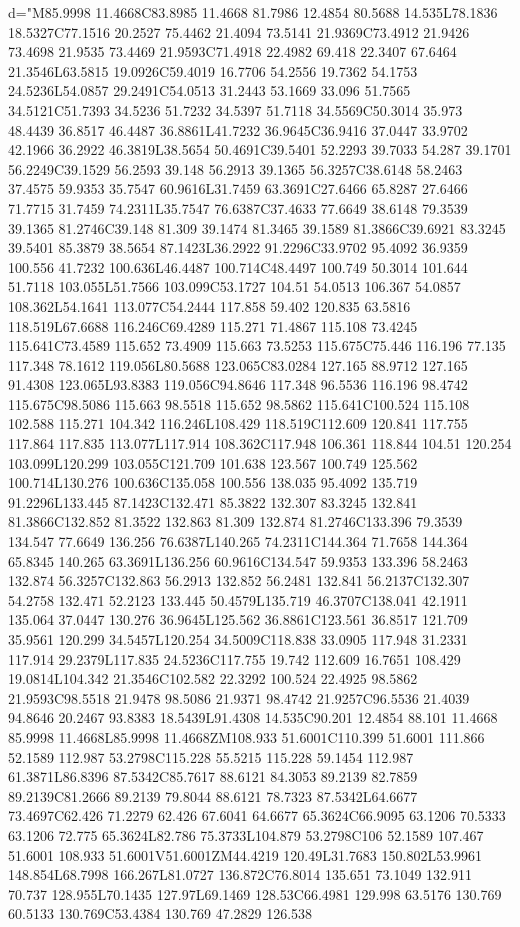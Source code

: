                     d="M85.9998 11.4668C83.8985 11.4668 81.7986 12.4854 80.5688 14.535L78.1836 18.5327C77.1516 20.2527 75.4462 21.4094 73.5141 21.9369C73.4912 21.9426 73.4698 21.9535 73.4469 21.9593C71.4918 22.4982 69.418 22.3407 67.6464 21.3546L63.5815 19.0926C59.4019 16.7706 54.2556 19.7362 54.1753 24.5236L54.0857 29.2491C54.0513 31.2443 53.1669 33.096 51.7565 34.5121C51.7393 34.5236 51.7232 34.5397 51.7118 34.5569C50.3014 35.973 48.4439 36.8517 46.4487 36.8861L41.7232 36.9645C36.9416 37.0447 33.9702 42.1966 36.2922 46.3819L38.5654 50.4691C39.5401 52.2293 39.7033 54.287 39.1701 56.2249C39.1529 56.2593 39.148 56.2913 39.1365 56.3257C38.6148 58.2463 37.4575 59.9353 35.7547 60.9616L31.7459 63.3691C27.6466 65.8287 27.6466 71.7715 31.7459 74.2311L35.7547 76.6387C37.4633 77.6649 38.6148 79.3539 39.1365 81.2746C39.148 81.309 39.1474 81.3465 39.1589 81.3866C39.6921 83.3245 39.5401 85.3879 38.5654 87.1423L36.2922 91.2296C33.9702 95.4092 36.9359 100.556 41.7232 100.636L46.4487 100.714C48.4497 100.749 50.3014 101.644 51.7118 103.055L51.7566 103.099C53.1727 104.51 54.0513 106.367 54.0857 108.362L54.1641 113.077C54.2444 117.858 59.402 120.835 63.5816 118.519L67.6688 116.246C69.4289 115.271 71.4867 115.108 73.4245 115.641C73.4589 115.652 73.4909 115.663 73.5253 115.675C75.446 116.196 77.135 117.348 78.1612 119.056L80.5688 123.065C83.0284 127.165 88.9712 127.165 91.4308 123.065L93.8383 119.056C94.8646 117.348 96.5536 116.196 98.4742 115.675C98.5086 115.663 98.5518 115.652 98.5862 115.641C100.524 115.108 102.588 115.271 104.342 116.246L108.429 118.519C112.609 120.841 117.755 117.864 117.835 113.077L117.914 108.362C117.948 106.361 118.844 104.51 120.254 103.099L120.299 103.055C121.709 101.638 123.567 100.749 125.562 100.714L130.276 100.636C135.058 100.556 138.035 95.4092 135.719 91.2296L133.445 87.1423C132.471 85.3822 132.307 83.3245 132.841 81.3866C132.852 81.3522 132.863 81.309 132.874 81.2746C133.396 79.3539 134.547 77.6649 136.256 76.6387L140.265 74.2311C144.364 71.7658 144.364 65.8345 140.265 63.3691L136.256 60.9616C134.547 59.9353 133.396 58.2463 132.874 56.3257C132.863 56.2913 132.852 56.2481 132.841 56.2137C132.307 54.2758 132.471 52.2123 133.445 50.4579L135.719 46.3707C138.041 42.1911 135.064 37.0447 130.276 36.9645L125.562 36.8861C123.561 36.8517 121.709 35.9561 120.299 34.5457L120.254 34.5009C118.838 33.0905 117.948 31.2331 117.914 29.2379L117.835 24.5236C117.755 19.742 112.609 16.7651 108.429 19.0814L104.342 21.3546C102.582 22.3292 100.524 22.4925 98.5862 21.9593C98.5518 21.9478 98.5086 21.9371 98.4742 21.9257C96.5536 21.4039 94.8646 20.2467 93.8383 18.5439L91.4308 14.535C90.201 12.4854 88.101 11.4668 85.9998 11.4668L85.9998 11.4668ZM108.933 51.6001C110.399 51.6001 111.866 52.1589 112.987 53.2798C115.228 55.5215 115.228 59.1454 112.987 61.3871L86.8396 87.5342C85.7617 88.6121 84.3053 89.2139 82.7859 89.2139C81.2666 89.2139 79.8044 88.6121 78.7323 87.5342L64.6677 73.4697C62.426 71.2279 62.426 67.6041 64.6677 65.3624C66.9095 63.1206 70.5333 63.1206 72.775 65.3624L82.786 75.3733L104.879 53.2798C106 52.1589 107.467 51.6001 108.933 51.6001V51.6001ZM44.4219 120.49L31.7683 150.802L53.9961 148.854L68.7998 166.267L81.0727 136.872C76.8014 135.651 73.1049 132.911 70.737 128.955L70.1435 127.97L69.1469 128.53C66.4981 129.998 63.5176 130.769 60.5133 130.769C53.4384 130.769 47.2829 126.538 
